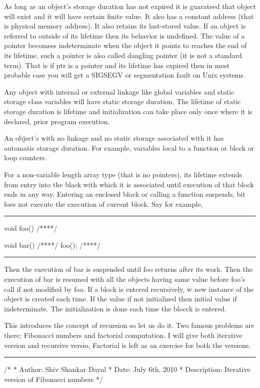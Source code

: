 As long as an object's storage duration has not expired it is
guarateed that object will exist and it will have certain finite
value. It also has a constant address (that is physical memory
address). It also retains its last-stored value. If an object is
referred to outside of its lifetime then its behavior is
undefined. The value of a pointer becomess indeterminate when the
object it points to reaches the end of its lifetime, such a pointer is
also called dangling pointer (it is not a standard term). That is if
ptr is a pointer and its lifetime has expired then in most probable
case you will get a SIGSEGV or segmentation fault on Unix systems.

Any object with internal or external linkage like global variables and
static storage class variables will have static storage duration. The
lifetime of static storage duration is lifetime and initialization can
take place only once where it is declared, prior program execution.

An object's with no linkage and no static storage associated with
it has automatic storage duration. For example, variables local to a
function or block or loop counters.

For a non-variable length array type (that is no pointers), its
lifetime extends from entry into the black with which it is associated
until execution of that block ends in any way. Entering an enclosed
block or calling a function suspends, bit foes not execute the
execution of current block. Say for example,
\blank[force,1mm]\hrule\blank[force,1mm]
\startCPP
void foo()
{
/****/
}

void bar()
{
/****/
foo();
/****/
}
\stopCPP
\blank[force,1mm]\hrule\blank[force,1mm]
Then the execution of bar is suspended until foo returns after its
work. Then the execution of bar is resumed with all the objects
having same value before foo's call if not modified by foo. If a block
is entered recursively, w new instance of the object is created each
time. If the value if not initialized then initial value if
indeterminate. The initialization is done each time the blocck is
entered.

This introduces the concept of recursion so let us do it. Two famous
problems are there; Fibonacci numbers and factorial computation. I
will give both iterative version and recursive versio, Factorial is
left as an exercise for both the versions.
\blank[force,1mm]\hrule\blank[force,1mm]
\startCPP
/*
 * Author: Shiv Shankar Dayal
 * Date: July 6th, 2010
 * Description: Iterative version of Fibonacci numbers
 */

